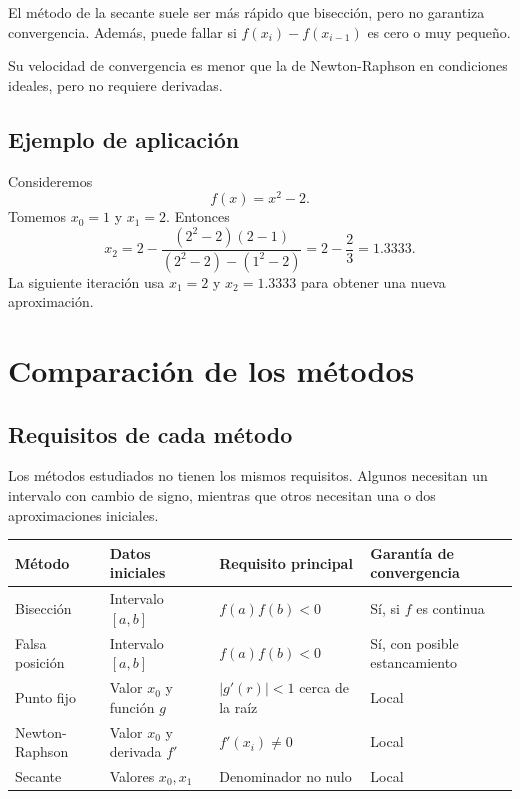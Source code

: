 \documentclass[a4,11pt]{aleph-notas}
\begin{document}
\begin{advertencia}
    El método de la secante suele ser más rápido que bisección, pero no garantiza convergencia. Además, puede fallar si $f(x_i)-f(x_{i-1})$ es cero o muy pequeño.
\end{advertencia}

Su velocidad de convergencia es menor que la de Newton-Raphson en condiciones ideales, pero no requiere derivadas.

\subsection{Ejemplo de aplicación}

\begin{ejem}
    Consideremos
    \[
        f(x)=x^2-2.
    \]
    Tomemos $x_0=1$ y $x_1=2$. Entonces
    \[
        x_2
        =
        2-\frac{(2^2-2)(2-1)}{(2^2-2)-(1^2-2)}
        =
        2-\frac{2}{3}
        =
        1.3333.
    \]
    La siguiente iteración usa $x_1=2$ y $x_2=1.3333$ para obtener una nueva aproximación.
\end{ejem}

\section{Comparación de los métodos}

\subsection{Requisitos de cada método}

Los métodos estudiados no tienen los mismos requisitos. Algunos necesitan un intervalo con cambio de signo, mientras que otros necesitan una o dos aproximaciones iniciales.

\begin{center}
\small
\begin{tabular}{p{}p{}p{}p{}}
\toprule
Método & Datos iniciales & Requisito principal & Garantía de convergencia \\
\midrule
Bisección & Intervalo $[a,b]$ & $f(a)f(b)<0$ & Sí, si $f$ es continua \\
Falsa posición & Intervalo $[a,b]$ & $f(a)f(b)<0$ & Sí, con posible estancamiento \\
Punto fijo & Valor $x_0$ y función $g$ & $|g'(r)|<1$ cerca de la raíz & Local \\
Newton-Raphson & Valor $x_0$ y derivada $f'$ & $f'(x_i)\neq 0$ & Local \\
Secante & Valores $x_0,x_1$ & Denominador no nulo & Local \\
\bottomrule
\end{tabular}
\end{center}
\end{document}
